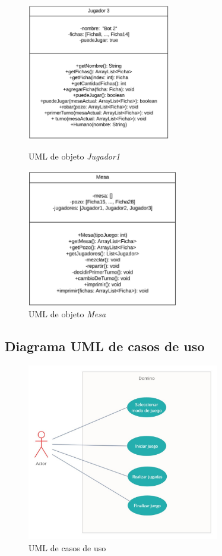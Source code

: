 \documentclass[12pt]{article}
\begin{document}
  \begin{figure}[h!]
    \centering
    \begin{minipage}[l]{0.45\textwidth}
      \centering
      \includegraphics[height=6cm]{umlo5.png}
      \caption{UML de objeto \textit{Jugador1}}
    \end{minipage}
    \begin{minipage}[r]{0.45\textwidth}
      \centering
      \includegraphics[height=6cm]{umlo6.png}
      \caption{UML de objeto \textit{Mesa}} 
    \end{minipage}
  \end{figure}

  \subsection{Diagrama UML de casos de uso}
  \begin{figure}[h!]
    \centering
    \includegraphics[width=0.75\textwidth]{umlcu.jpg}
    \caption{UML de casos de uso}
  \end{figure}
\end{document}
